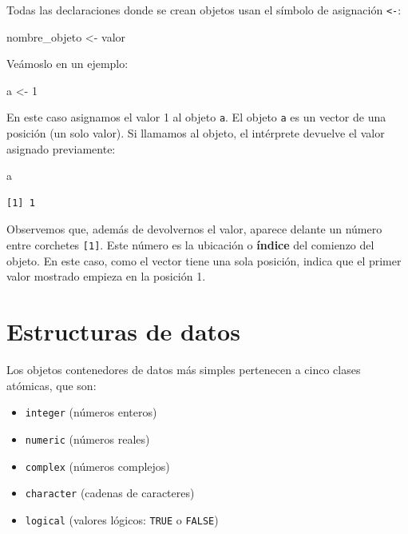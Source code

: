 \documentclass[
  spanish,
  letterpaper,
  DIV=11,
  numbers=noendperiod]{scrreprt}
\newenvironment{Shaded}{\begin{snugshade}}{\end{snugshade}}
\newcommand{\DecValTok}[1]{\textcolor[rgb]{0.68,0.00,0.00}{#1}}
\newcommand{\NormalTok}[1]{\textcolor[rgb]{0.00,0.23,0.31}{#1}}
\newcommand{\OtherTok}[1]{\textcolor[rgb]{0.00,0.23,0.31}{#1}}
\begin{document}
Todas las declaraciones donde se crean objetos usan el símbolo de
asignación \texttt{\textless{}-}:

\begin{Shaded}
\begin{Highlighting}[]
\NormalTok{nombre\_objeto }\OtherTok{\textless{}{-}}\NormalTok{ valor}
\end{Highlighting}
\end{Shaded}

Veámoslo en un ejemplo:

\begin{Shaded}
\begin{Highlighting}[]
\NormalTok{a }\OtherTok{\textless{}{-}} \DecValTok{1}
\end{Highlighting}
\end{Shaded}

En este caso asignamos el valor 1 al objeto \texttt{a}. El objeto
\texttt{a} es un vector de una posición (un solo valor). Si llamamos al
objeto, el intérprete devuelve el valor asignado previamente:

\begin{Shaded}
\begin{Highlighting}[]
\NormalTok{a}
\end{Highlighting}
\end{Shaded}

\begin{verbatim}
[1] 1
\end{verbatim}

Observemos que, además de devolvernos el valor, aparece delante un
número entre corchetes \texttt{{[}1{]}}. Este número es la ubicación o
\textbf{índice} del comienzo del objeto. En este caso, como el vector
tiene una sola posición, indica que el primer valor mostrado empieza en
la posición 1.

\section{Estructuras de datos}\label{estructuras-de-datos}

Los objetos contenedores de datos más simples pertenecen a cinco clases
atómicas, que son:

\begin{itemize}
\item
  \texttt{integer} (números enteros)
\item
  \texttt{numeric} (números reales)
\item
  \texttt{complex} (números complejos)
\item
  \texttt{character} (cadenas de caracteres)
\item
  \texttt{logical} (valores lógicos: \texttt{TRUE} o \texttt{FALSE})
\end{itemize}
\end{document}
